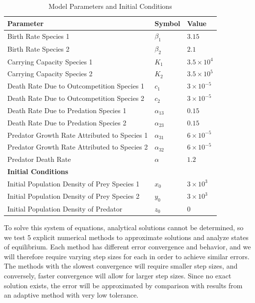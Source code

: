 \begin{table}[htbp]
\centering
\caption{Model Parameters and Initial Conditions}
\label{tab:constants}
\begin{tabular}{@{}lll@{}}
\toprule
\textbf{Parameter} & \textbf{Symbol} & \textbf{Value} \\ \midrule
Birth Rate Species 1                         & $\beta_1$      & $3.15$                  \\
Birth Rate Species 2                         & $\beta_2$      & $2.1$                   \\
Carrying Capacity Species 1                  & $K_1$          & $3.5\times10^{4}$       \\
Carrying Capacity Species 2                  & $K_2$          & $3.5\times10^{5}$       \\
Death Rate Due to Outcompetition Species 1                         & $c_1$          & $3\times10^{-5}$        \\
Death Rate Due to Outcompetition Species 2                         & $c_2$          & $3\times10^{-5}$        \\
Death Rate Due to Predation Species 1                     & $\alpha_{13}$  & $0.15$                  \\
Death Rate Due to Predation Species 2                     & $\alpha_{23}$  & $0.15$                  \\
Predator Growth Rate Attributed to Species 1 & $\alpha_{31}$  & $6\times10^{-5}$        \\
Predator Growth Rate Attributed to Species 2 & $\alpha_{32}$  & $6\times10^{-5}$        \\
Predator Death Rate                          & $\alpha$       & $1.2$                   \\ 
\midrule 
\textbf{Initial Conditions} \\ 
\midrule
Initial Population Density of Prey Species 1 & 
$x_0$ & $3\times10^{3}$ \\
Initial Population Density of Prey Species 2 &
$y_0$ & $3\times10^{3}$ \\
Initial Population Density of Predator &
$z_0$ & $0$ \\
\bottomrule
\end{tabular}
\end{table}

To solve this system of equations, analytical solutions cannot be determined, so we test 5 explicit numerical methods to approximate solutions and analyze states of equilibrium.
Each method has different error convergence and behavior, and we will therefore require varying step sizes for each in order to achieve similar errors. 
The methods with the slowest convergence will require smaller step sizes, and conversely, faster convergence will allow for larger step sizes.
Since no exact solution exists, the error will be approximated by comparison with results from an adaptive method with very low tolerance. 